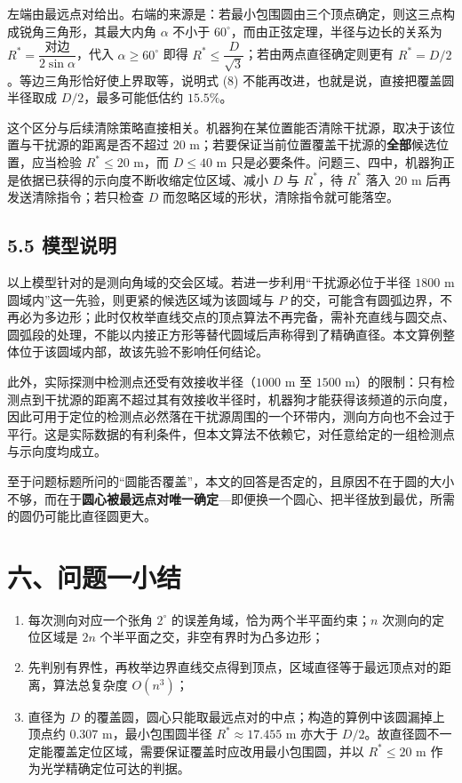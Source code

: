 \documentclass[UTF8,a4paper,zihao=-4,fontset=fandol]{ctexart}
\begin{document}
左端由最远点对给出。右端的来源是：若最小包围圆由三个顶点确定，则这三点构成锐角三角形，其最大内角 $\alpha$ 不小于 $60^\circ$，而由正弦定理，半径与边长的关系为 $R^*=\dfrac{\text{对边}}{2\sin\alpha}$，代入 $\alpha\ge60^\circ$ 即得 $R^*\le\dfrac{D}{\sqrt3}$；若由两点直径确定则更有 $R^*=D/2$。等边三角形恰好使上界取等，说明式 (8) 不能再改进，也就是说，直接把覆盖圆半径取成 $D/2$，最多可能低估约 $15.5\%$。

这个区分与后续清除策略直接相关。机器狗在某位置能否清除干扰源，取决于该位置与干扰源的距离是否不超过 $20$ m；若要保证当前位置覆盖干扰源的\textbf{全部}候选位置，应当检验 $R^*\le20$ m，而 $D\le40$ m 只是必要条件。问题三、四中，机器狗正是依据已获得的示向度不断收缩定位区域、减小 $D$ 与 $R^*$，待 $R^*$ 落入 $20$ m 后再发送清除指令；若只检查 $D$ 而忽略区域的形状，清除指令就可能落空。

\subsection*{5.5 模型说明}

以上模型针对的是测向角域的交会区域。若进一步利用“干扰源必位于半径 $1800$ m 圆域内”这一先验，则更紧的候选区域为该圆域与 $P$ 的交，可能含有圆弧边界，不再必为多边形；此时仅枚举直线交点的顶点算法不再完备，需补充直线与圆交点、圆弧段的处理，不能以内接正方形等替代圆域后声称得到了精确直径。本文算例整体位于该圆域内部，故该先验不影响任何结论。

此外，实际探测中检测点还受有效接收半径（$1000$ m 至 $1500$ m）的限制：只有检测点到干扰源的距离不超过其有效接收半径时，机器狗才能获得该频道的示向度，因此可用于定位的检测点必然落在干扰源周围的一个环带内，测向方向也不会过于平行。这是实际数据的有利条件，但本文算法不依赖它，对任意给定的一组检测点与示向度均成立。

至于问题标题所问的“圆能否覆盖”，本文的回答是否定的，且原因不在于圆的大小不够，而在于\textbf{圆心被最远点对唯一确定}---即便换一个圆心、把半径放到最优，所需的圆仍可能比直径圆更大。

\section*{六、问题一小结}

\begin{enumerate}
\item 每次测向对应一个张角 $2^\circ$ 的误差角域，恰为两个半平面约束；$n$ 次测向的定位区域是 $2n$ 个半平面之交，非空有界时为凸多边形；
\item 先判别有界性，再枚举边界直线交点得到顶点，区域直径等于最远顶点对的距离，算法总复杂度 $O(n^3)$；
\item 直径为 $D$ 的覆盖圆，圆心只能取最远点对的中点；构造的算例中该圆漏掉上顶点约 $0.307$ m，最小包围圆半径 $R^*\approx17.455$ m 亦大于 $D/2$。故直径圆不一定能覆盖定位区域，需要保证覆盖时应改用最小包围圆，并以 $R^*\le20$ m 作为光学精确定位可达的判据。
\end{enumerate}
\end{document}
